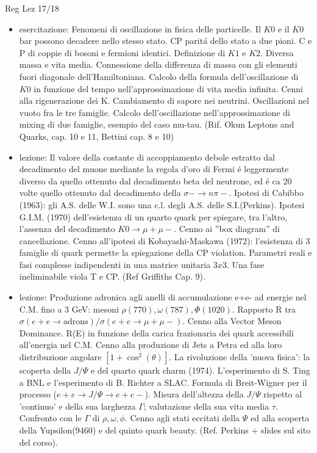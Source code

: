 \begin{frame}[allowframebreaks]{Reg Lez 17/18}
\begin{itemize}
\item esercitazione: Fenomeni di oscillazione in fisica delle particelle. Il $K0$ e il $K0$bar possono decadere nello stesso stato. CP parit\'a dello stato a due pioni. C e P di coppie di bosoni e fermioni identici. Definizione di $K1$ e $K2$. Diversa massa e vita media. Connessione della differenza di massa con gli elementi fuori diagonale dell'Hamiltoniana. Calcolo della formula dell'oscillazione di $K0$ in funzione del tempo nell'approssimazione di vita media infinita. Cenni alla rigenerazione dei K. Cambiamento di sapore nei neutrini. Oscillazioni nel vuoto fra le tre famiglie. Calcolo dell'oscillazione nell'approssimazione di mixing di due famiglie, esempio del caso mu-tau. (Rif. Okun Leptons and Quarks, cap. 10 e 11, Bettini cap. 8 e 10)

\item lezione: Il valore della costante di accoppiamento debole estratto dal decadimento del muone mediante la regola d'oro di Fermi \'e leggermente diverso da quello ottenuto dal decadimento beta del neutrone, ed \'e ca 20 volte quello ottenuto dal decadimento della $\sigma-\to n\pi-$. Ipotesi di Cabibbo (1963): gli A.S. delle W.I. sono una c.l. degli A.S. delle S.I.(Perkins). Ipotesi G.I.M. (1970) dell'esistenza di un quarto quark per spiegare, tra l'altro, l'assenza del decadimento $K0\to\mu+\mu-$. Cenno ai ''box diagram'' di cancellazione. Cenno all'ipotesi di Kobayashi-Maskawa (1972): l'esistenza di 3 famiglie di quark permette la spiegazione della CP violation. Parametri reali e fasi complesse indipendenti in una matrice unitaria $3x3$. Una fase ineliminabile viola T e CP. (Ref Griffiths Cap. 9).

\item  lezione: Produzione adronica agli anelli di accumulazione e+e- ad energie nel C.M. fino a 3 GeV: mesoni $\rho(770),\omega(787),\Phi(1020)$. Rapporto R tra $\sigma(e+e\to\text{adrons})/\sigma(e+e\to\mu+\mu-)$. Cenno alla Vector Meson Dominance. R(E) in funzione della carica frazionaria dei quark accessibili all'energia nel C.M. Cenno alla produzione di Jets a Petra ed alla loro distribuzione angolare $[1+\cos^2(\theta)]$. La rivoluzione della 'nuova fisica': la scoperta della $J/\Psi$ e del quarto quark charm (1974). L'esperimento di S. Ting a BNL e l'esperimento di B. Richter a SLAC. Formula di Breit-Wigner per il processo ($e+e\to J/\Psi\to e+e-$). Misura dell'altezza della $J/\Psi$ rispetto al 'continuo' e della sua larghezza $\Gamma$; valutazione della sua vita media $\tau$. Confronto con le $\Gamma$ di $\rho,\omega,\phi$. Cenno agli stati eccitati della $\Psi$ ed alla scoperta della Yupsilon(9460) e del quinto quark beauty. (Ref. Perkins + slides sul sito del corso).


\end{itemize}
\end{frame}

